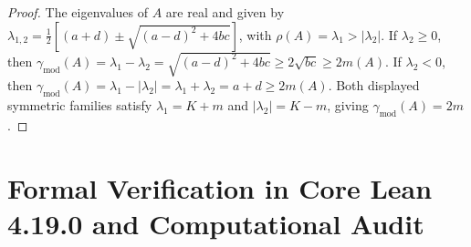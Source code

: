 \documentclass[11pt]{article}
\theoremstyle{definition}
\begin{document}
\begin{proof}
The eigenvalues of $A$ are real and given by $\lambda_{1,2} = \frac{1}{2}[(a + d) \pm \sqrt{(a - d)^2 + 4bc}]$, with $\rho(A) = \lambda_1 > |\lambda_2|$. If $\lambda_2 \ge 0$, then $\gamma_{\mathrm{mod}}(A) = \lambda_1 - \lambda_2 = \sqrt{(a - d)^2 + 4bc} \ge 2\sqrt{bc} \ge 2m(A)$. If $\lambda_2 < 0$, then $\gamma_{\mathrm{mod}}(A) = \lambda_1 - |\lambda_2| = \lambda_1 + \lambda_2 = a + d \ge 2m(A)$. Both displayed symmetric families satisfy $\lambda_1 = K + m$ and $|\lambda_2| = K - m$, giving $\gamma_{\mathrm{mod}}(A) = 2m$.
\end{proof}

\section{Formal Verification in Core Lean 4.19.0 and Computational Audit}
\end{document}
